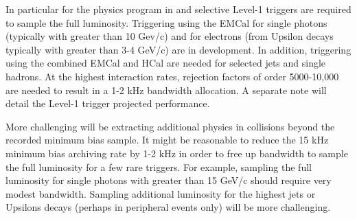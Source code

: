 In particular for the physics program in \pp and \pau selective Level-1 triggers are required to sample the full luminosity.   Triggering using the EMCal for single photons (typically with \pt greater than 10 Gev/c) and for electrons (from Upsilon decays typically with \pt greater than 3-4 GeV/c) are in development.  In addition, triggering using the combined EMCal and HCal are needed for selected jets and single hadrons.    At the highest \pp interaction rates, rejection factors of order 5000-10,000 are needed to result in a 1-2 kHz bandwidth allocation.    A separate note will detail the Level-1 trigger projected performance. 

More challenging will be extracting additional physics in \auau collisions beyond the recorded minimum bias sample.   It might be reasonable to reduce the 15 kHz minimum bias archiving rate by 1-2 kHz in order to free up bandwidth to sample the full luminosity for a few rare triggers.   For example, sampling the full \auau luminosity for single photons with \pt greater than 15 GeV/c should require very modest bandwidth.   Sampling additional luminosity for the highest \pt jets or Upsilons decays (perhaps in peripheral events only) will be more challenging.
